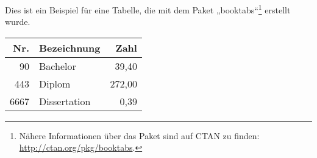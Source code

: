 
Dies ist ein Beispiel für eine Tabelle, die mit dem Paket „booktabs“\footnote{Nähere Informationen über das Paket sind auf CTAN zu finden: \url{http://ctan.org/pkg/booktabs}.} erstellt wurde.

\vspace{0.5em}

\begin{center}

\begin{tabular}{rlr}\toprule
Nr. & Bezeichnung & Zahl \\
\midrule
90 & Bachelor & 39,40 \\
443 & Diplom & 272,00 \\
6667 & Dissertation & 0,39 \\
\bottomrule
\end{tabular}

\end{center}


